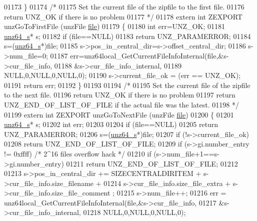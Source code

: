 \begin{DoxyCode}
01173 \}
01174 \textcolor{comment}{/*}
01175 \textcolor{comment}{  Set the current file of the zipfile to the first file.}
01176 \textcolor{comment}{  return UNZ\_OK if there is no problem}
01177 \textcolor{comment}{*/}
01178 \textcolor{keyword}{extern} \textcolor{keywordtype}{int} ZEXPORT unzGoToFirstFile (unzFile \hyperlink{structfile}{file})
01179 \{
01180     \textcolor{keywordtype}{int} err=UNZ\_OK;
01181     \hyperlink{structunz64__s}{unz64\_s}* s;
01182     \textcolor{keywordflow}{if} (file==NULL)
01183         \textcolor{keywordflow}{return} UNZ\_PARAMERROR;
01184     s=(\hyperlink{structunz64__s}{unz64\_s}*)file;
01185     s->pos\_in\_central\_dir=s->offset\_central\_dir;
01186     s->num\_file=0;
01187     err=unz64local\_GetCurrentFileInfoInternal(file,&s->cur\_file\_info,
01188                                              &s->cur\_file\_info\_internal,
01189                                              NULL,0,NULL,0,NULL,0);
01190     s->current\_file\_ok = (err == UNZ\_OK);
01191     \textcolor{keywordflow}{return} err;
01192 \}
01193 
01194 \textcolor{comment}{/*}
01195 \textcolor{comment}{  Set the current file of the zipfile to the next file.}
01196 \textcolor{comment}{  return UNZ\_OK if there is no problem}
01197 \textcolor{comment}{  return UNZ\_END\_OF\_LIST\_OF\_FILE if the actual file was the latest.}
01198 \textcolor{comment}{*/}
01199 \textcolor{keyword}{extern} \textcolor{keywordtype}{int} ZEXPORT unzGoToNextFile (unzFile  \hyperlink{structfile}{file})
01200 \{
01201     \hyperlink{structunz64__s}{unz64\_s}* s;
01202     \textcolor{keywordtype}{int} err;
01203 
01204     \textcolor{keywordflow}{if} (file==NULL)
01205         \textcolor{keywordflow}{return} UNZ\_PARAMERROR;
01206     s=(\hyperlink{structunz64__s}{unz64\_s}*)file;
01207     \textcolor{keywordflow}{if} (!s->current\_file\_ok)
01208         \textcolor{keywordflow}{return} UNZ\_END\_OF\_LIST\_OF\_FILE;
01209     \textcolor{keywordflow}{if} (s->gi.number\_entry != 0xffff)    \textcolor{comment}{/* 2^16 files overflow hack */}
01210       \textcolor{keywordflow}{if} (s->num\_file+1==s->gi.number\_entry)
01211         \textcolor{keywordflow}{return} UNZ\_END\_OF\_LIST\_OF\_FILE;
01212 
01213     s->pos\_in\_central\_dir += SIZECENTRALDIRITEM + s->cur\_file\_info.size\_filename +
01214             s->cur\_file\_info.size\_file\_extra + s->cur\_file\_info.size\_file\_comment ;
01215     s->num\_file++;
01216     err = unz64local\_GetCurrentFileInfoInternal(file,&s->cur\_file\_info,
01217                                                &s->cur\_file\_info\_internal,
01218                                                NULL,0,NULL,0,NULL,0);

\end{DoxyCode}
